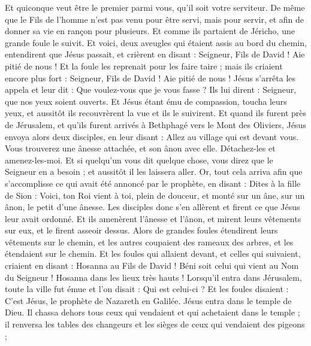 \begin{multicols}{2}
Et quiconque veut être le premier parmi vous, qu'il soit votre serviteur.
De même que le Fils de l'homme n'est pas venu pour être servi, mais pour servir, et afin de donner sa vie en rançon pour plusieurs.
Et comme ils partaient de Jéricho, une grande foule le suivit.
Et voici, deux aveugles qui étaient assis au bord du chemin, entendirent que Jésus passait, et crièrent en disant : Seigneur, Fils de David ! Aie pitié de nous !
Et la foule les reprenait pour les faire taire ; mais ils criaient encore plus fort : Seigneur, Fils de David ! Aie pitié de nous !
Jésus s'arrêta les appela et leur dit : Que voulez-vous que je vous fasse ?
Ils lui dirent : Seigneur, que nos yeux soient ouverts.
Et Jésus étant ému de compassion, toucha leurs yeux, et aussitôt ils recouvrèrent la vue et ils le suivirent.
\VerseOne{}Et quand ils furent près de Jérusalem, et qu'ils furent arrivés à Bethphagé vers le Mont des Oliviers, Jésus envoya alors deux disciples,
en leur disant : Allez au village qui est devant vous. Vous trouverez une ânesse attachée, et son ânon avec elle. Détachez-les et amenez-les-moi.
Et si quelqu'un vous dit quelque chose, vous direz que le Seigneur en a besoin ; et aussitôt il les laissera aller.
Or, tout cela arriva afin que s'accomplisse ce qui avait été annoncé par le prophète, en disant :
Dites à la fille de Sion : Voici, ton Roi vient à toi, plein de douceur, et monté sur un âne, sur un ânon, le petit d'une ânesse.
Les disciples donc s'en allèrent et firent ce que Jésus leur avait ordonné.
Et ils amenèrent l'ânesse et l'ânon, et mirent leurs vêtements sur eux, et le firent asseoir dessus.
Alors de grandes foules étendirent leurs vêtements sur le chemin, et les autres coupaient des rameaux des arbres, et les étendaient sur le chemin.
Et les foules qui allaient devant, et celles qui suivaient, criaient en disant : Hosanna au Fils de David ! Béni soit celui qui vient au Nom du Seigneur ! Hosanna dans les lieux très hauts !
Lorsqu'il entra dans Jérusalem, toute la ville fut émue et l'on disait : Qui est celui-ci ?
Et les foules disaient : C'est Jésus, le prophète de Nazareth en Galilée.
Jésus entra dans le temple de Dieu. Il chassa dehors tous ceux qui vendaient et qui achetaient dans le temple ; il renversa les tables des changeurs et les sièges de ceux qui vendaient des pigeons ;

\end{multicols}

